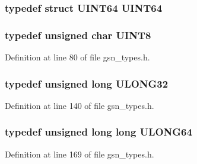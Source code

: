 \hypertarget{a00660_ga2360b1c5f857c84c180aef97cc0612c9}{
\subsubsection[{UINT64}]{\setlength{\rightskip}{0pt plus 5cm}typedef struct {\bf UINT64} {\bf UINT64}}}
\label{a00660_ga2360b1c5f857c84c180aef97cc0612c9}
\hypertarget{a00660_gab27e9918b538ce9d8ca692479b375b6a}{
\subsubsection[{UINT8}]{\setlength{\rightskip}{0pt plus 5cm}typedef unsigned char {\bf UINT8}}}
\label{a00660_gab27e9918b538ce9d8ca692479b375b6a}


Definition at line 80 of file gsn\_\-types.h.

\hypertarget{a00660_gaa4ee7c96d5dff444cca1bf965c9f77fd}{
\subsubsection[{ULONG32}]{\setlength{\rightskip}{0pt plus 5cm}typedef unsigned long {\bf ULONG32}}}
\label{a00660_gaa4ee7c96d5dff444cca1bf965c9f77fd}


Definition at line 140 of file gsn\_\-types.h.

\hypertarget{a00660_ga28961430434ccabca6862ea93fe9a15b}{
\subsubsection[{ULONG64}]{\setlength{\rightskip}{0pt plus 5cm}typedef unsigned long long {\bf ULONG64}}}
\label{a00660_ga28961430434ccabca6862ea93fe9a15b}


Definition at line 169 of file gsn\_\-types.h.


